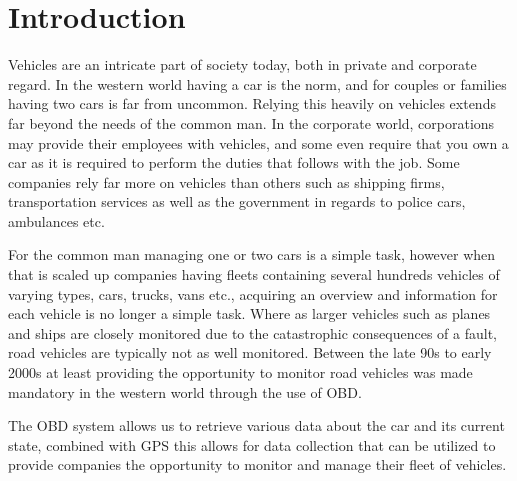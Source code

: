 \chapter{Introduction}
Vehicles are an intricate part of society today, both in private and corporate regard.
In the western world having a car is the norm, and for couples or families having two cars is far from uncommon.
Relying this heavily on vehicles extends far beyond the needs of the common man.
In the corporate world, corporations may provide their employees with vehicles, and some even require that you own a car as it is required to perform the duties that follows with the job.
Some companies rely far more on vehicles than others such as shipping firms, transportation services as well as the government in regards to police cars, ambulances etc.

For the common man managing one or two cars is a simple task, however when that is scaled up companies having fleets containing several hundreds vehicles of varying types, cars, trucks, vans etc., acquiring an overview and information for each vehicle is no longer a simple task.
Where as larger vehicles such as planes and ships are closely monitored due to the catastrophic consequences of a fault, road vehicles are typically not as well monitored.
Between the late 90s to early 2000s at least providing the opportunity to monitor road vehicles was made mandatory in the western world through the use of \acl{OBD}.\cite{EUDirective}

The \ac{OBD} system allows us to retrieve various data about the car and its current state, combined with GPS this allows for data collection that can be utilized to provide companies the opportunity to monitor and manage their fleet of vehicles.
